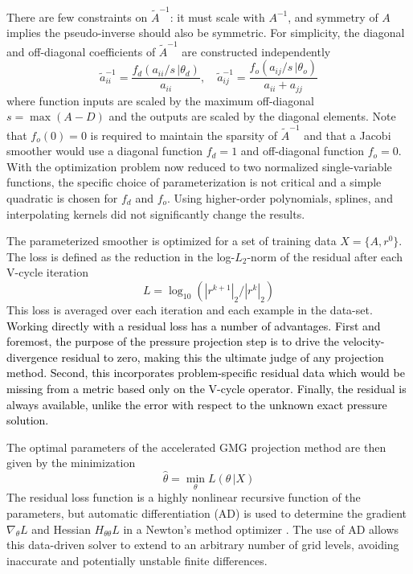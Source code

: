 \documentclass[]{elsarticle}
\begin{document}
There are few constraints on $\tilde A^{-1}$: it must scale with $A^{-1}$, and symmetry of $A$ implies the pseudo-inverse should also be symmetric. For simplicity, the diagonal and off-diagonal coefficients of $\tilde A^{-1}$ are constructed independently 
\begin{equation}\label{eq:approxinv}
    \tilde a^{-1}_{ii} = \frac{f_d(a_{ii}/s\,|\theta_d)}{a_{ii}} , \quad
    \tilde a^{-1}_{ij} = \frac{f_o(a_{ij}/s\,|\theta_o)}{a_{ii}+a_{jj}}
\end{equation}
where function inputs are scaled by the maximum off-diagonal $s=\max(A-D)$ and the outputs are scaled by the diagonal elements. Note that $f_o(0)=0$ is required to maintain the sparsity of $\tilde A^{-1}$ and that a Jacobi smoother would use a diagonal function $f_d=1$ and off-diagonal function $f_o=0$. With the optimization problem now reduced to two normalized single-variable functions, the specific choice of parameterization is not critical and a simple quadratic is chosen for $f_d$ and $f_o$. Using higher-order polynomials, splines, and interpolating kernels did not significantly change the results.

The parameterized smoother is optimized for a set of training data $X=\{A,r^0\}$. The loss is defined as the reduction in the log-$L_2$-norm of the residual after each V-cycle iteration 
\begin{equation}
L = \log_{10}(|r^{k+1}|_2 / |r^{k}|_2)
\end{equation}
This loss is averaged over each iteration and each example in the data-set. \textcolor{black}{Working directly with a residual loss has a number of advantages. First and foremost, the purpose of the pressure projection step is to drive the velocity-divergence residual to zero, making this the ultimate judge of any projection method. Second, this incorporates problem-specific residual data which would be missing from a metric based only on the V-cycle operator. Finally, the residual is always available, unlike the error with respect to the unknown exact pressure solution.}

The optimal parameters of the accelerated GMG projection method are then given by the minimization
\begin{equation}
    \hat\theta = \min_\theta L(\theta\, |X)
\end{equation}
The residual loss function is a highly nonlinear recursive function of the parameters, but automatic differentiation (AD) is used to determine the gradient $\nabla_\theta L$ and Hessian $H_{\theta\theta} L$ in a Newton's method optimizer  \cite{mogensen2018optim,RevelsLubinPapamarkou2016}. The use of AD allows this data-driven solver to extend to an arbitrary number of grid levels, avoiding inaccurate and potentially unstable finite differences.
\end{document}
